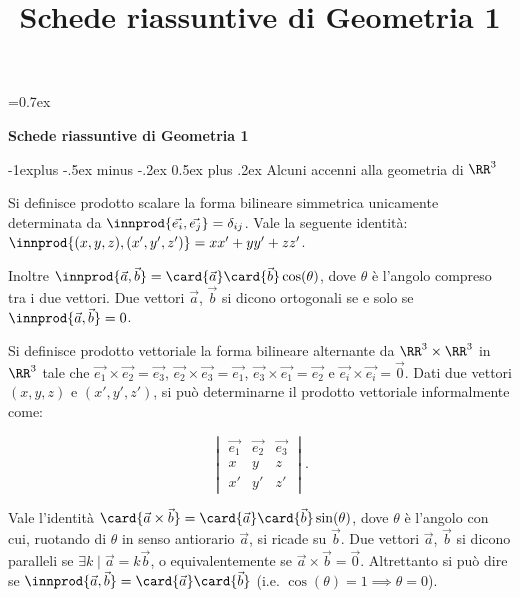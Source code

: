 \documentclass[10pt,landscape]{article}
\title{Schede riassuntive di Geometria 1}
\makeatletter
\renewcommand{\subsection}{\@startsection{subsection}{2}{0mm}%
	{-1explus -.5ex minus -.2ex}%
	{0.5ex plus .2ex}%
	{\normalfont\normalsize\bfseries}}
\makeatother
\begin{document}
	
	\parskip=0.7ex
	
	\raggedright
	\footnotesize
	
	\begin{center}
		\Large{\textbf{Schede riassuntive di Geometria 1}} \\
	\end{center}
	\begin{multicols}{3}
		\setlength{\premulticols}{1pt}
		\setlength{\postmulticols}{1pt}
		\setlength{\multicolsep}{1pt}
		\setlength{\columnsep}{2pt}
		
		\subsection{Alcuni accenni alla geometria di \texorpdfstring{$\RR^3$}{R\^{}3}}
		
		Si definisce prodotto scalare la forma
		bilineare simmetrica unicamente determinata da $\innprod{\vec{e_i}, \vec{e_j}} = \delta_{ij}$. Vale la seguente identità: $\innprod{(x, y, z), (x', y', z')} = xx' + yy' + zz'$.
		
		Inoltre $\innprod{\vec{a}, \vec{b}} = \card{\vec{a}} \card{\vec{b}} \cos(\theta)$, dove $\theta$ è l'angolo compreso tra i due vettori.
		Due vettori $\vec{a}$, $\vec{b}$ si dicono ortogonali
		se e solo se $\innprod{\vec{a}, \vec{b}} = 0$.
		
		Si definisce prodotto vettoriale la forma bilineare alternante
		da $\RR^3 \times \RR^3$
		in $\RR^3$ tale che $\vec{e_1} \times \vec{e_2} = \vec{e_3}$,
		$\vec{e_2} \times \vec{e_3} = \vec{e_1}$,
		$\vec{e_3} \times \vec{e_1} = \vec{e_2}$ e
		$\vec{e_i} \times \vec{e_i} = \vec{0}$. Dati due
		vettori $(x, y, z)$ e $(x', y', z')$, si può determinarne
		il prodotto vettoriale informalmente come:
		
		\[ \begin{vmatrix}
			\vec{e_1} & \vec{e_2} & \vec{e_3} \\
			x & y & z \\
			x' & y' & z'
		\end{vmatrix} . \]
		
		Vale l'identità $\card{\vec{a} \times \vec{b}} = \card{\vec{a}} \card{\vec{b}} \sin(\theta)$, dove $\theta$ è l'angolo con cui, ruotando di
		$\theta$ in senso antiorario $\vec{a}$, si ricade su $\vec{b}$.
		Due vettori $\vec{a}$, $\vec{b}$ si dicono paralleli se $\exists
		k \mid \vec{a} = k \vec{b}$, o equivalentemente se
		$\vec{a} \times \vec{b} = \vec{0}$. Altrettanto si può dire
		se $\innprod{\vec{a}, \vec{b}} = \card{\vec{a}} \card{\vec{b}}$ (i.e.
		$\cos(\theta) = 1 \implies \theta = 0$).
		

\end{multicols}
\end{document}
